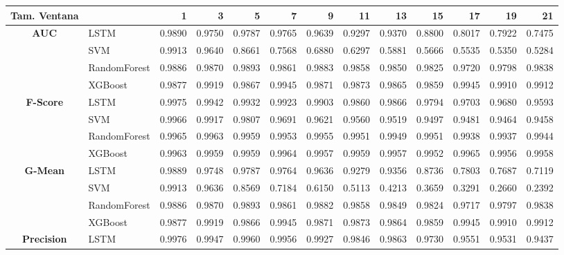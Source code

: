\begin{table}[h]
	\centering
	\begin{adjustbox}{max width=15cm}
		\begin{tabular}{|c|l|r|r|r|r|r|r|r|r|r|r|r|}
			\hline
			\textbf{Tam. Ventana}&         &      1  &      3  &      5  &      7  &      9  &      11 &      13 &      15 &      17 &      19 &      21 \\
			\hline
			\textbf{AUC} & LSTM &  0.9890 &  0.9750 &  0.9787 &  0.9765 &  0.9639 &  0.9297 &  0.9370 &  0.8800 &  0.8017 &  0.7922 &  0.7475 \\
			& SVM &  0.9913 &  0.9640 &  0.8661 &  0.7568 &  0.6880 &  0.6297 &  0.5881 &  0.5666 &  0.5535 &  0.5350 &  0.5284 \\
			& RandomForest &  0.9886 &  0.9870 &  0.9893 &  0.9861 &  0.9883 &  0.9858 &  0.9850 &  0.9825 &  0.9720 &  0.9798 &  0.9838 \\
			& XGBoost &  0.9877 &  0.9919 &  0.9867 &  0.9945 &  0.9871 &  0.9873 &  0.9865 &  0.9859 &  0.9945 &  0.9910 &  0.9912 \\
			\hline
			\textbf{F-Score} & LSTM &  0.9975 &  0.9942 &  0.9932 &  0.9923 &  0.9903 &  0.9860 &  0.9866 &  0.9794 &  0.9703 &  0.9680 &  0.9593 \\
			& SVM &  0.9966 &  0.9917 &  0.9807 &  0.9691 &  0.9621 &  0.9560 &  0.9519 &  0.9497 &  0.9481 &  0.9464 &  0.9458 \\
			& RandomForest &  0.9965 &  0.9963 &  0.9959 &  0.9953 &  0.9955 &  0.9951 &  0.9949 &  0.9951 &  0.9938 &  0.9937 &  0.9944 \\
			& XGBoost &  0.9963 &  0.9959 &  0.9959 &  0.9964 &  0.9957 &  0.9959 &  0.9957 &  0.9952 &  0.9965 &  0.9956 &  0.9958 \\
			\hline
			\textbf{G-Mean} & LSTM &  0.9889 &  0.9748 &  0.9787 &  0.9764 &  0.9636 &  0.9279 &  0.9356 &  0.8736 &  0.7803 &  0.7687 &  0.7119 \\
			& SVM &  0.9913 &  0.9636 &  0.8569 &  0.7184 &  0.6150 &  0.5113 &  0.4213 &  0.3659 &  0.3291 &  0.2660 &  0.2392 \\
			& RandomForest &  0.9886 &  0.9870 &  0.9893 &  0.9861 &  0.9882 &  0.9858 &  0.9849 &  0.9824 &  0.9717 &  0.9797 &  0.9838 \\
			& XGBoost &  0.9877 &  0.9919 &  0.9866 &  0.9945 &  0.9871 &  0.9873 &  0.9864 &  0.9859 &  0.9945 &  0.9910 &  0.9912 \\
			\hline
			\textbf{Precision} & LSTM &  0.9976 &  0.9947 &  0.9960 &  0.9956 &  0.9927 &  0.9846 &  0.9863 &  0.9730 &  0.9551 &  0.9531 &  0.9437 \\

\end{tabular}
\end{adjustbox}
\end{table}

